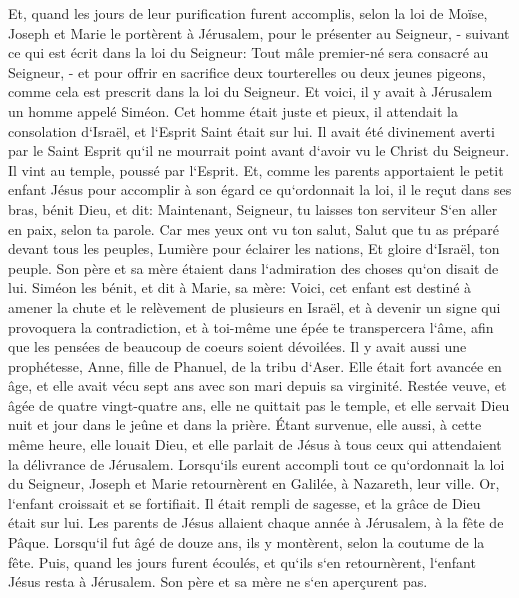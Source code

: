 \verse Et, quand les jours de leur purification furent accomplis, selon la loi de Moïse, Joseph et Marie le portèrent à Jérusalem, pour le présenter au Seigneur, - 
\verse suivant ce qui est écrit dans la loi du Seigneur: Tout mâle premier-né sera consacré au Seigneur, - 
\verse et pour offrir en sacrifice deux tourterelles ou deux jeunes pigeons, comme cela est prescrit dans la loi du Seigneur. 
\verse Et voici, il y avait à Jérusalem un homme appelé Siméon. Cet homme était juste et pieux, il attendait la consolation d`Israël, et l`Esprit Saint était sur lui. 
\verse Il avait été divinement averti par le Saint Esprit qu`il ne mourrait point avant d`avoir vu le Christ du Seigneur. 
\verse Il vint au temple, poussé par l`Esprit. Et, comme les parents apportaient le petit enfant Jésus pour accomplir à son égard ce qu`ordonnait la loi, 
\verse il le reçut dans ses bras, bénit Dieu, et dit: 
\verse Maintenant, Seigneur, tu laisses ton serviteur S`en aller en paix, selon ta parole. 
\verse Car mes yeux ont vu ton salut, 
\verse Salut que tu as préparé devant tous les peuples, 
\verse Lumière pour éclairer les nations, Et gloire d`Israël, ton peuple. 
\verse Son père et sa mère étaient dans l`admiration des choses qu`on disait de lui. 
\verse Siméon les bénit, et dit à Marie, sa mère: Voici, cet enfant est destiné à amener la chute et le relèvement de plusieurs en Israël, et à devenir un signe qui provoquera la contradiction, 
\verse et à toi-même une épée te transpercera l`âme, afin que les pensées de beaucoup de coeurs soient dévoilées. 
\verse Il y avait aussi une prophétesse, Anne, fille de Phanuel, de la tribu d`Aser. Elle était fort avancée en âge, et elle avait vécu sept ans avec son mari depuis sa virginité. 
\verse Restée veuve, et âgée de quatre vingt-quatre ans, elle ne quittait pas le temple, et elle servait Dieu nuit et jour dans le jeûne et dans la prière. 
\verse Étant survenue, elle aussi, à cette même heure, elle louait Dieu, et elle parlait de Jésus à tous ceux qui attendaient la délivrance de Jérusalem. 
\verse Lorsqu`ils eurent accompli tout ce qu`ordonnait la loi du Seigneur, Joseph et Marie retournèrent en Galilée, à Nazareth, leur ville. 
\verse Or, l`enfant croissait et se fortifiait. Il était rempli de sagesse, et la grâce de Dieu était sur lui. 
\verse Les parents de Jésus allaient chaque année à Jérusalem, à la fête de Pâque. 
\verse Lorsqu`il fut âgé de douze ans, ils y montèrent, selon la coutume de la fête. 
\verse Puis, quand les jours furent écoulés, et qu`ils s`en retournèrent, l`enfant Jésus resta à Jérusalem. Son père et sa mère ne s`en aperçurent pas. 
